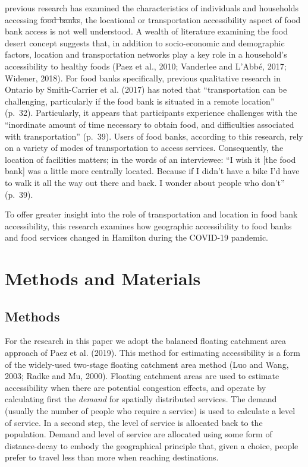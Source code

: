 \documentclass[]{elsarticle} %
\providecommand{\DIFaddtex}[1]{{\protect\color{blue}\uwave{#1}}} %
\providecommand{\DIFdeltex}[1]{{\protect\color{red}\sout{#1}}}                      %
\providecommand{\DIFaddbegin}{} %
\providecommand{\DIFaddend}{} %
\providecommand{\DIFdelbegin}{} %
\providecommand{\DIFdelend}{} %
\providecommand{\DIFadd}[1]{\texorpdfstring{\DIFaddtex{#1}}{#1}} %
\providecommand{\DIFdel}[1]{\texorpdfstring{\DIFdeltex{#1}}{}} %
\newcommand{\DIFscaledelfig}{0.5}
\newlength{\DIFdelgraphicswidth} %
\newlength{\DIFdelgraphicsheight} %
\newcommand{\DIFaddincludegraphics}[2][]{{\color{blue}\fbox{\DIFOincludegraphics[#1]{#2}}}} %
\newcommand{\DIFdelincludegraphics}[2][]{%
\sbox{\DIFdelgraphicsbox}{\DIFOincludegraphics[#1]{#2}}%
\settoboxwidth{\DIFdelgraphicswidth}{\DIFdelgraphicsbox} %
\settoboxtotalheight{\DIFdelgraphicsheight}{\DIFdelgraphicsbox} %
\scalebox{\DIFscaledelfig}{%
\parbox[b]{\DIFdelgraphicswidth}{\usebox{\DIFdelgraphicsbox}\\[-\baselineskip] \rule{\DIFdelgraphicswidth}{0em}}\llap{\resizebox{\DIFdelgraphicswidth}{\DIFdelgraphicsheight}{%
\setlength{\unitlength}{\DIFdelgraphicswidth}%
\begin{picture}(1,1)%
\thicklines\linethickness{2pt} %
{\color[rgb]{1,0,0}\put(0,0){\framebox(1,1){}}}%
{\color[rgb]{1,0,0}\put(0,0){\line( 1,1){1}}}%
{\color[rgb]{1,0,0}\put(0,1){\line(1,-1){1}}}%
\end{picture}%
}\hspace*{3pt}}} %
} %
\DeclareRobustCommand{\DIFaddbegin}{\DIFOaddbegin \let\includegraphics\DIFaddincludegraphics} %
\DeclareRobustCommand{\DIFaddend}{\DIFOaddend \let\includegraphics\DIFOincludegraphics} %
\DeclareRobustCommand{\DIFdelbegin}{\DIFOdelbegin \let\includegraphics\DIFdelincludegraphics} %
\DeclareRobustCommand{\DIFdelend}{\DIFOaddend \let\includegraphics\DIFOincludegraphics} %
\begin{document}
\DIFadd{While }\DIFaddend previous research has examined the characteristics of individuals
and households accessing \DIFdelbegin \DIFdel{food banks}\DIFdelend \DIFaddbegin \DIFadd{emergency and community food services}\DIFaddend , the
locational or transportation accessibility aspect of food bank access is
not well understood. A wealth of literature examining the food desert
concept suggests that, in addition to socio-economic and demographic
factors, location and transportation networks play a key role in a
household's accessibility to healthy foods (Paez et al., 2010; Vanderlee
and L'Abbé, 2017; Widener, 2018). For food banks specifically, previous
qualitative research in Ontario by Smith-Carrier et al. (2017) has noted
that ``transportation can be challenging, particularly if the food bank
is situated in a remote location'' (p.~32). Particularly, it appears
that participants experience challenges with the ``inordinate amount of
time necessary to obtain food, and difficulties associated with
transportation'' (p.~39). Users of food banks, according to this
research, rely on a variety of modes of transportation to access
services. Consequently, the location of facilities matters; in the words
of an interviewee: ``I wish it {[}the food bank{]} was a little more
centrally located. Because if I didn't have a bike I'd have to walk it
all the way out there and back. I wonder about people who don't''
(p.~39).

To offer greater insight into the role of transportation and location in
food bank accessibility, this research examines how geographic
accessibility to food banks and food services changed in Hamilton during
the COVID-19 pandemic.

\hypertarget{methods-and-materials}{%
\section{Methods and Materials}\label{methods-and-materials}}

\hypertarget{methods}{%
\subsection{Methods}\label{methods}}

For the research in this paper we adopt the balanced floating catchment
area approach of Paez et al. (2019). This method for estimating
accessibility is a form of the widely-used two-stage floating catchment
area method (Luo and Wang, 2003; Radke and Mu, 2000). Floating catchment
areas are used to estimate accessibility when there are potential
congestion effects, and operate by calculating first the \emph{demand}
for spatially distributed services. The demand (usually the number of
people who require a service) is used to calculate a level of service.
In a second step, the level of service is allocated back to the
population. Demand and level of service are allocated using some form of
distance-decay to embody the geographical principle that, given a
choice, people prefer to travel less than more when reaching
destinations.
\end{document}
